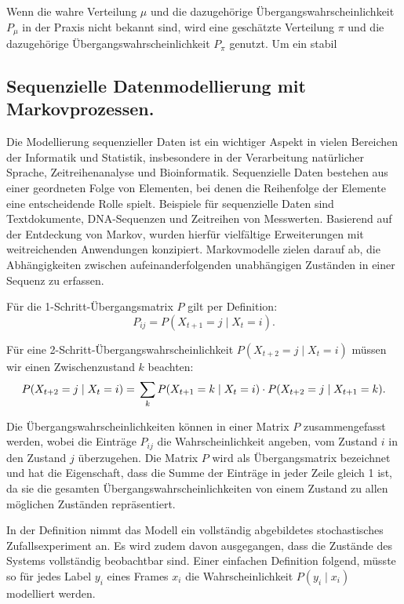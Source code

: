 Wenn die wahre Verteilung $\mu$ und die dazugehörige Übergangswahrscheinlichkeit $P_\mu$ in der Praxis nicht bekannt sind, wird eine geschätzte Verteilung $\pi$ und die dazugehörige Übergangswahrscheinlichkeit $P_\pi$ genutzt. Um ein stabil


\subsection{Sequenzielle Datenmodellierung mit Markovprozessen.}

Die Modellierung sequenzieller Daten ist ein wichtiger Aspekt in vielen Bereichen der Informatik und Statistik, insbesondere in der Verarbeitung natürlicher Sprache, Zeitreihenanalyse und Bioinformatik. Sequenzielle Daten bestehen aus einer geordneten Folge von Elementen, bei denen die Reihenfolge der Elemente eine entscheidende Rolle spielt. Beispiele für sequenzielle Daten sind Textdokumente, DNA-Sequenzen und Zeitreihen von Messwerten.
Basierend auf der Entdeckung von Markov, wurden hierfür vielfältige Erweiterungen mit weitreichenden Anwendungen konzipiert.
Markovmodelle zielen darauf ab, die Abhängigkeiten zwischen aufeinanderfolgenden unabhängigen Zuständen in einer Sequenz zu erfassen.

Für die 1-Schritt-Übergangsmatrix $P$ gilt per Definition:
\begin{equation}
P_{ij} = P(X_{t+1} = j \mid X_t = i).
\end{equation}

Für eine 2-Schritt-Übergangswahrscheinlichkeit $P(X_{t+2} = j \mid X_t = i)$ müssen wir einen Zwischenzustand $k$ beachten:
\begin{equation}
P(X_{t+2} = j \mid X_t = i) = \newline \sum_k P(X_{t+1} = k \mid X_t = i) \cdot P(X_{t+2} = j \mid X_{t+1} = k).
\end{equation}

Die Übergangswahrscheinlichkeiten können in einer Matrix $P$ zusammengefasst werden, wobei die Einträge $P_{ij}$ die Wahrscheinlichkeit angeben, vom Zustand $i$ in den Zustand $j$ überzugehen. Die Matrix $P$ wird als Übergangsmatrix bezeichnet und hat die Eigenschaft, dass die Summe der Einträge in jeder Zeile gleich 1 ist, da sie die gesamten Übergangswahrscheinlichkeiten von einem Zustand zu allen möglichen Zuständen repräsentiert.

In der Definition nimmt das Modell ein vollständig abgebildetes stochastisches Zufallsexperiment an. Es wird zudem davon ausgegangen, dass die Zustände des Systems vollständig beobachtbar sind. Einer einfachen Definition folgend, müsste so für jedes Label $y_i$ eines Frames $x_i$ die Wahrscheinlichkeit $P(y_i \mid x_i)$ modelliert werden. \citet{drake88}

